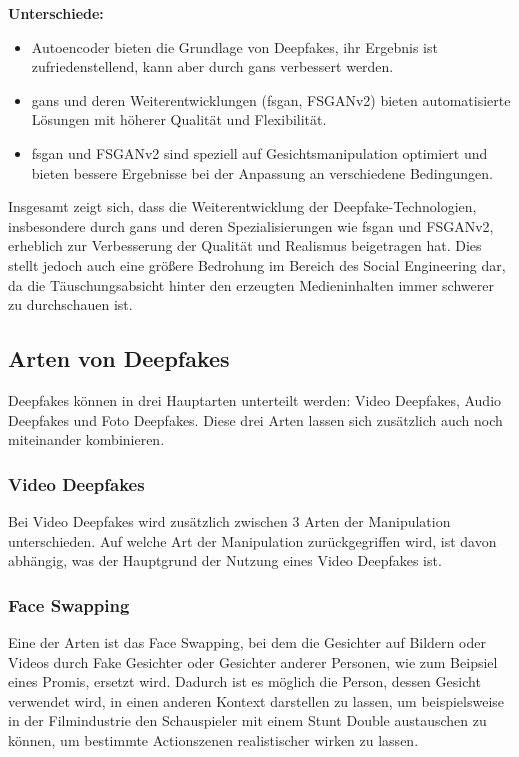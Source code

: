 \textbf{Unterschiede:}
\begin{itemize}
    \item Autoencoder bieten die Grundlage von Deepfakes, ihr Ergebnis ist zufriedenstellend, kann aber durch \glspl{gan} verbessert werden.
    \item \glspl{gan} und deren Weiterentwicklungen (\gls{fsgan}, FSGANv2) bieten automatisierte Lösungen mit höherer Qualität und Flexibilität.
    \item \gls{fsgan} und FSGANv2 sind speziell auf Gesichtsmanipulation optimiert und bieten bessere Ergebnisse bei der Anpassung an verschiedene Bedingungen\cite{Deepfakes-a-survey-and-introduction-to-the-topical-collection}.
\end{itemize}

Insgesamt zeigt sich, dass die Weiterentwicklung der Deepfake-Technologien, insbesondere durch \glspl{gan} und deren Spezialisierungen wie \gls{fsgan} und FSGANv2, erheblich zur Verbesserung der Qualität und Realismus beigetragen hat.
Dies stellt jedoch auch eine größere Bedrohung im Bereich des Social Engineering dar, da die Täuschungsabsicht hinter den erzeugten Medieninhalten immer schwerer zu durchschauen ist.

\subsection{Arten von Deepfakes}
Deepfakes können in drei Hauptarten unterteilt werden: Video Deepfakes, Audio Deepfakes und Foto Deepfakes. Diese drei Arten lassen sich zusätzlich auch noch miteinander kombinieren.\cite{ResearchGate}\newline
\subsubsection*{Video Deepfakes}
Bei Video Deepfakes wird zusätzlich zwischen 3 Arten der Manipulation unterschieden. Auf welche Art der Manipulation zurückgegriffen wird, ist davon abhängig, was der Hauptgrund der Nutzung eines Video Deepfakes ist.\cite{ResearchGate}

\subsubsection*{Face Swapping}
Eine der Arten ist das Face Swapping, bei dem die Gesichter auf Bildern oder Videos durch Fake Gesichter oder Gesichter anderer Personen, wie zum Beipsiel eines Promis, ersetzt wird.
Dadurch ist es möglich die Person, dessen Gesicht verwendet wird, in einen anderen Kontext darstellen zu lassen, um beispielsweise in der Filmindustrie den Schauspieler mit einem Stunt Double austauschen zu können, um bestimmte Actionszenen realistischer wirken zu lassen.\cite{ResearchGate}

